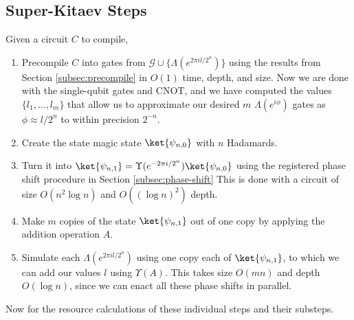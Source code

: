 \subsection{Super-Kitaev Steps}

Given a circuit $C$ to compile,

\begin{enumerate}
\item Precompile $C$ into gates from $\mathcal{G} \cup \{\Lambda(e^{2\pi i l / 2^n})\}$
using the results from Section \ref{subsec:precompile} in $O(1)$ time, depth,
and size.
Now we are done with the single-qubit gates and CNOT, and we have computed
the values $\{l_1, \ldots , l_m\}$ that allow us to approximate our
desired $m$
$\Lambda(e^{i\phi})$ gates as $\phi \approx l/2^n$ to within precision
$2^{-n}$.
\item Create the state magic state $\ket{\psi_{n,0}}$ with $n$ Hadamards.
\item Turn it into $\ket{\psi_{n,1}} = \Upsilon(e^{-2\pi i / 2^n}) \ket{\psi_{n,0}}$
using the registered phase shift procedure in Section \ref{subsec:phase-shift}
This is done with a circuit of size $O(n^2\log n)$ and $O((\log n)^2)$ depth.
\item Make $m$ copies of the state $\ket{\psi_{n,1}}$ out of one copy by 
applying the addition operation $A$.
\item Simulate each $\Lambda(e^{2\pi i l / 2^n})$
using one copy each of $\ket{\psi_{n,1}}$, to which we can add our
values $l$ using $\Upsilon(A)$.
This takes size $O(mn)$ and depth $O(\log n)$, since we can enact
all these phase shifts in parallel.
\end{enumerate}

Now for the resource calculations of these individual steps and their
substeps.













